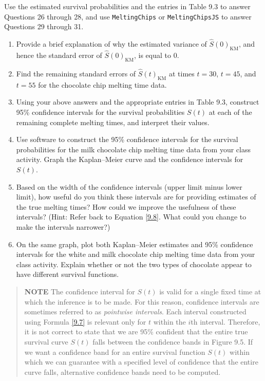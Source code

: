 \documentclass[
]{book}
\begin{document}
Use the estimated survival probabilities and the entries in Table 9.3 to answer Questions 26 through 28, and use \texttt{MeltingChips} or \texttt{MeltingChipsJS} to answer Questions 29 through 31.

\begin{enumerate}
\def\labelenumi{\arabic{enumi}.}
\setcounter{enumi}{25}
\item
  Provide a brief explanation of why the estimated variance of \(\hat S(0)_{\mathrm{KM}}\), and hence the standard error of \(\hat S(0)_{\mathrm{KM}}\), is equal to 0.
\item
  Find the remaining standard errors of \(\hat S(t)_{\mathrm{KM}}\) at times \(t = 30\), \(t = 45\), and \(t = 55\) for the chocolate chip melting time data.
\item
  Using your above answers and the appropriate entries in Table 9.3, construct 95\% confidence intervals for the survival probabilities \(S(t)\) at each of the remaining complete melting times, and interpret their values.
\item
  Use software to construct the 95\% confidence intervals for the survival probabilities for the milk chocolate chip melting time data from your class activity. Graph the Kaplan--Meier curve and the confidence intervals for \(S(t)\).
\item
  Based on the width of the confidence intervals (upper limit minus lower limit), how useful do you think these intervals are for providing estimates of the true melting times? How could we improve the usefulness of these intervals? (Hint: Refer back to Equation \ref{9.8}. What could you change to make the intervals narrower?)\\
\item
  On the same graph, plot both Kaplan--Meier estimates and 95\% confidence intervals for the white and milk chocolate chip melting time data from your class activity. Explain whether or not the two types of chocolate appear to have different survival functions.
\end{enumerate}

\begin{quote}
\textbf{NOTE} The confidence interval for \(S(t)\) is valid for a single fixed time at which the inference is to be made. For this reason, confidence intervals are sometimes referred to as \emph{pointwise intervals}. Each interval constructed using Formula \ref{9.7} is relevant only for \(t\) within the \(i\)th interval. Therefore, it is not correct to state that we are 95\% confident that the entire true survival curve \(S(t)\) falls between the confidence bands in Figure 9.5. If we want a confidence band for an entire survival function \(S(t)\) within which we can guarantee with a specified level of confidence that the entire curve falls, alternative confidence bands need to be computed.
\end{quote}
\end{document}
